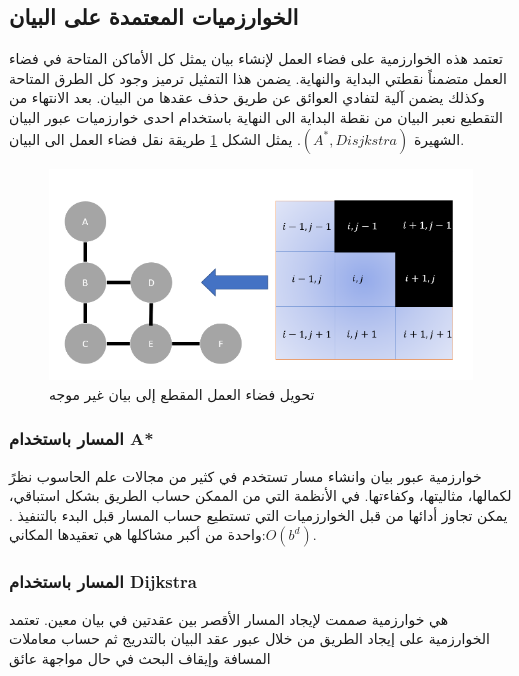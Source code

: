 
\subsection{الخوارزميات المعتمدة على البيان}

تعتمد هذه الخوارزمية على فضاء العمل لإنشاء بيان يمثل كل الأماكن المتاحة في فضاء العمل متضمناً نقطتي البداية والنهاية. يضمن هذا التمثيل ترميز وجود كل الطرق المتاحة وكذلك يضمن آلية لتفادي العوائق عن طريق حذف عقدها من البيان. بعد الانتهاء من التقطيع نعبر البيان من نقطة البداية الى النهاية باستخدام احدى خوارزميات عبور البيان الشهيرة $ (A^*, Disjkstra)$. يمثل الشكل \ref{fig:fig101} طريقة نقل فضاء العمل الى البيان.

\begin{figure}
	\centering
	\includegraphics[width=0.8\linewidth]{figs/10/fig10_1}
	\caption{ تحويل فضاء العمل المقطع إلى بيان غير موجه}
	\label{fig:fig101}
\end{figure}

\subsubsection{المسار باستخدام A*}

خوارزمية عبور بيان وانشاء مسار تستخدم في كثير من مجالات علم الحاسوب نظرً لكمالها، مثاليتها، وكفاءتها. في الأنظمة التي من الممكن حساب الطريق بشكل استباقي، يمكن تجاوز أدائها من قبل الخوارزميات التي تستطيع حساب المسار قبل البدء بالتنفيذ \cite{d1} . واحدة من أكبر مشاكلها هي تعقيدها المكاني:$  O\left(b^d\right) $.

\subsubsection{المسار باستخدام Dijkstra}

هي خوارزمية صممت لإيجاد المسار الأقصر بين عقدتين في بيان معين. تعتمد الخوارزمية على إيجاد الطريق من خلال عبور عقد البيان بالتدريج ثم حساب معاملات المسافة وإيقاف البحث في حال مواجهة عائق \cite{d2}


